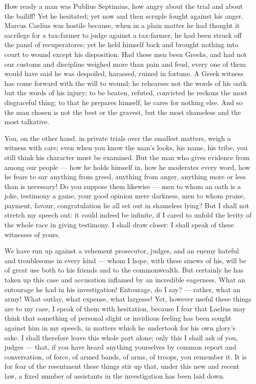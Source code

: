  How ready a man was Publius Septimius, how angry about the trial and about the bailiff! Yet he hesitated; yet now and then scruple fought against his anger. Marcus Caelius was hostile because, when in a plain matter he had thought it sacrilege for a tax-farmer to judge against a tax-farmer, he had been struck off the panel of recuperatores; yet he held himself back and brought nothing into court to wound except his disposition. Had these men been Greeks, and had not our customs and discipline weighed more than pain and feud, every one of them would have said he was despoiled, harassed, ruined in fortune. A Greek witness has come forward with the will to wound; he rehearses not the words of his oath but the words of his injury; to be beaten, refuted, convicted he reckons the most disgraceful thing; to that he prepares himself, he cares for nothing else. And so the man chosen is not the best or the gravest, but the most shameless and the most talkative.

 You, on the other hand, in private trials over the smallest matters, weigh a witness with care; even when you know the man's looks, his name, his tribe, you still think his character must be examined. But the man who gives evidence from among our people --- how he holds himself in, how he moderates every word, how he fears to say anything from greed, anything from anger, anything more or less than is necessary! Do you suppose them likewise --- men to whom an oath is a joke, testimony a game, your good opinion mere darkness, men to whom praise, payment, favour, congratulation lie all set out in shameless lying? But I shall not stretch my speech out: it could indeed be infinite, if I cared to unfold the levity of the whole race in giving testimony. I shall draw closer: I shall speak of these witnesses of yours.

 We have run up against a vehement prosecutor, judges, and an enemy hateful and troublesome in every kind --- whom I hope, with these sinews of his, will be of great use both to his friends and to the commonwealth. But certainly he has taken up this case and accusation inflamed by an incredible eagerness. What an entourage he had in his investigation! Entourage, do I say? --- rather, what an army! What outlay, what expense, what largesse! Yet, however useful these things are to my case, I speak of them with hesitation, because I fear that Laelius may think that something of personal slight or invidious feeling has been sought against him in my speech, in matters which he undertook for his own glory's sake. I shall therefore leave this whole part alone; only this I shall ask of you, judges --- that, if you have heard anything yourselves by common report and conversation, of force, of armed bands, of arms, of troops, you remember it. It is for fear of the resentment these things stir up that, under this new and recent law, a fixed number of assistants in the investigation has been laid down.


